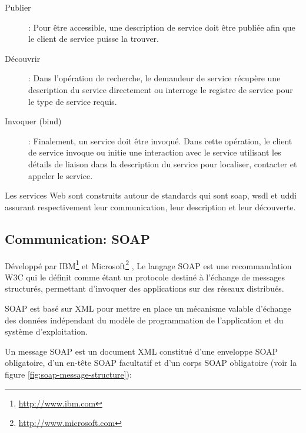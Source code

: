 \SpecialItem
\begin{description}
\item[Publier]: Pour être accessible, une description de service doit
  être publiée afin que le client de service puisse la
  trouver.

\item[Découvrir]: Dans l'opération de recherche, le demandeur de
  service récupère une description du service directement ou interroge
  le registre de service pour le type de service requis.

\item[Invoquer (bind)]: Finalement, un service doit être invoqué. Dans
  cette opération, le client de service invoque ou initie une
  interaction avec le service utilisant les détails de liaison dans la
  description du service pour localiser, contacter et appeler le
  service.
\end{description}

Les services Web sont construits autour de standards qui sont
\acrshort{soap}, \acrshort{wsdl} et \acrshort{uddi} assurant
respectivement leur communication, leur description et leur
découverte.

  \subsection{Communication: SOAP}
  \label{sec:soap}
  Développé par IBM\footnote{\url{http://www.ibm.com}} et
  Microsoft\footnote{\url{http://www.microsoft.com}}
  \cite{box2000simple}, Le langage \textsc{SOAP} est une
  recommandation \textsc{W3C} \cite{mitra2003soap} qui le définit
  comme étant un protocole destiné à l'échange de messages structurés,
  permettant d'invoquer des applications sur des réseaux distribués.

  \textsc{SOAP} est basé sur \textsc{XML} pour mettre en place un
  mécanisme valable d'échange des données indépendant du modèle de
  programmation de l'application et du système d'exploitation.

  Un message \textsc{SOAP} est un document XML constitué d'une
  enveloppe \textsc{SOAP} obligatoire, d'un en-tête \textsc{SOAP}
  facultatif et d'un corps \textsc{SOAP} obligatoire (voir la figure
  \ref{fig:soap-message-structure}):

  

